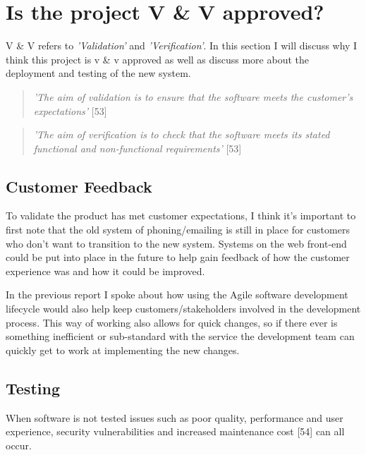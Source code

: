 \section{Is the project V \& V approved?}
  V \& V refers to \textit{'Validation'} and \textit{'Verification'}. In this section I will discuss why I think this project is v \&
  v approved as well as discuss more about the deployment and testing of the new system.

  \begin{quote}
    \textit{'The aim of validation is to ensure that the software meets the customer's expectations'} [53]
  \end{quote}

  \begin{quote}
    \textit{'The aim of verification is to check that the software meets its stated functional and non-functional requirements'} [53]
  \end{quote}

  \subsection{Customer Feedback}
  To validate the product has met customer expectations, I think it's important to first note that the old system of phoning/emailing is still in 
  place for customers who don't want to transition to the new system. Systems on the web front-end could be put into place in the future to help 
  gain feedback of how the customer experience was and how it could be improved.

  In the previous report I spoke about how using the Agile software development lifecycle would also help keep customers/stakeholders involved in the 
  development process. This way of working also allows for quick changes, so if there ever is something inefficient or sub-standard with the service the 
  development team can quickly get to work at implementing the new changes.
  
  \subsection{Testing}
  \label{sec:Testing}

  When software is not tested issues such as poor quality, performance and user experience, security vulnerabilities and increased maintenance cost [54]
  can all occur.

